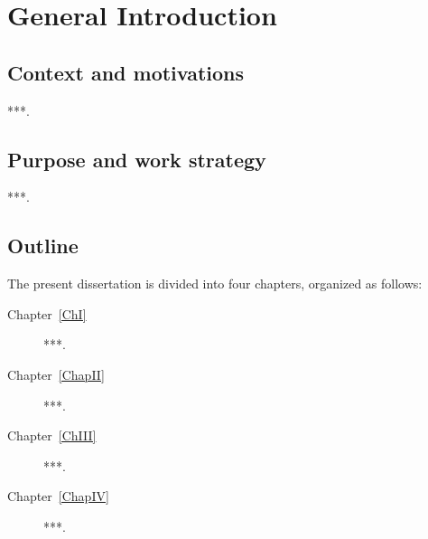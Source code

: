 \chapter*{General Introduction}
{}

\section*{Context and motivations}
***.

\section*{Purpose and work strategy}
***.

\section*{Outline}
The present dissertation is divided into four chapters, organized as follows:

\begin{description}
  	\item[Chapter~\ref{ChI}] ***.
  	\item[Chapter~\ref{ChapII}]***.
  	\item[Chapter~\ref{ChIII}] ***.
  	\item[Chapter~\ref{ChapIV}] ***.
\end{description}